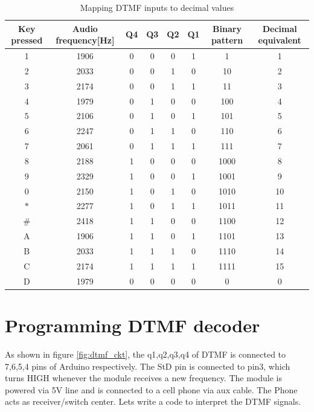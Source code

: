 \begin{table}
    \renewcommand{\arraystretch}{1.2}
    \vspace{3mm}
    \begin{tabular}{|c|c|c|c|c|c|c|c|}
    \hline
        \textbf{Key pressed} & \textbf{Audio frequency[Hz]} & \textbf{Q4} & \textbf{Q3} & \textbf{Q2} & \textbf{Q1} & \textbf{Binary pattern} & \textbf{Decimal equivalent} \\ \hline
        1 & 1906 & 0 & 0 & 0 & 1 & 1 & 1 \\ \hline
        2 & 2033 & 0 & 0 & 1 & 0 & 10 & 2 \\ \hline
        3 & 2174 & 0 & 0 & 1 & 1 & 11 & 3 \\ \hline
        4 & 1979 & 0 & 1 & 0 & 0 & 100 & 4 \\ \hline
        5 & 2106 & 0 & 1 & 0 & 1 & 101 & 5 \\ \hline
        6 & 2247 & 0 & 1 & 1 & 0 & 110 & 6 \\ \hline
        7 & 2061 & 0 & 1 & 1 & 1 & 111 & 7 \\ \hline
        8 & 2188 & 1 & 0 & 0 & 0 & 1000 & 8 \\ \hline
        9 & 2329 & 1 & 0 & 0 & 1 & 1001 & 9 \\ \hline
        0 & 2150 & 1 & 0 & 1 & 0 & 1010 & 10 \\ \hline
        $*$ & 2277 & 1 & 0 & 1 & 1 & 1011 & 11 \\ \hline
        \# & 2418 & 1 & 1 & 0 & 0 & 1100 & 12 \\ \hline
        A & 1906 & 1 & 1 & 0 & 1 & 1101 & 13 \\ \hline
        B & 2033 & 1 & 1 & 1 & 0 & 1110 & 14 \\ \hline
        C & 2174 & 1 & 1 & 1 & 1 & 1111 & 15 \\ \hline
        D & 1979 & 0 & 0 & 0 & 0 & 0 & 0 \\ \hline
    \end{tabular}
    \vspace{3mm}
    \caption[DTMF pattern]{Mapping \ac{DTMF} inputs to decimal values}
    \label{fig:dtmf_map}
\end{table}

\section{Programming DTMF decoder}

\par As shown in figure \ref{fig:dtmf_ckt}, the q1,q2,q3,q4 of \ac{DTMF} is connected to 7,6,5,4 pins of Arduino respectively. The StD pin is connected to pin3, which turns HIGH whenever the module receives a new frequency. The module is powered via 5V line and is connected to a cell phone via aux cable. The Phone acts as receiver/switch center. Lets write a code to interpret the \ac{DTMF} signals.

